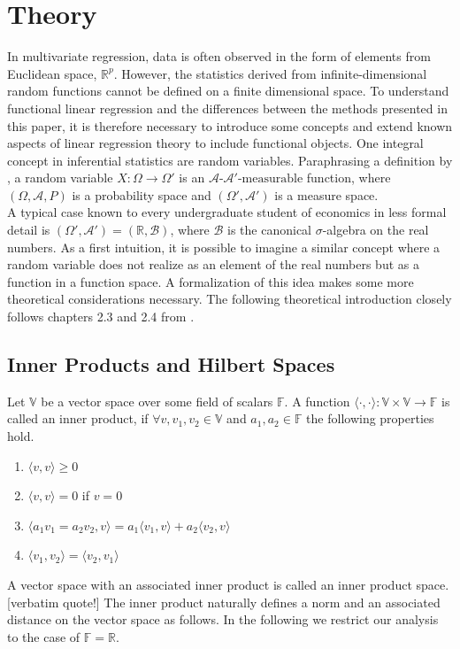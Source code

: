 \documentclass[11pt,twoside,a4paper]{article}
\begin{document}
	\section{Theory}
	In multivariate regression, data is often observed in the form of elements from Euclidean space, $\mathbb{R}^p$. However, the statistics derived from infinite-dimensional random functions cannot be defined on a finite dimensional space. To understand functional linear regression and the differences between the methods presented in this paper, it is therefore necessary to introduce some concepts and extend known aspects of linear regression theory to include functional objects. One integral concept in inferential statistics are random variables. Paraphrasing a definition by \cite{bauer_wahrscheinlichkeitstheorie_2020}, a random variable $X:\Omega \rightarrow \Omega'$ is an $\mathcal{A} \text{-} \mathcal{A'} \text{-measurable}$ function, where $(\Omega, \mathcal{A}, P)$ is a probability space and $(\Omega', \mathcal{A'})$ is a measure space.\\
	A typical case known to every undergraduate student of economics in less formal detail is $(\Omega', \mathcal{A'}) = (\mathbb{R}, \mathcal{B})$, where $\mathcal{B}$ is the canonical $\sigma$-algebra on the real numbers. As a first intuition, it is possible to imagine a similar concept where a random variable does not realize as an element of the real numbers but as a function in a function space. A formalization of this idea makes some more theoretical considerations necessary. The following theoretical introduction closely follows chapters 2.3 and 2.4 from \cite{hsing_theoretical_2015}. 
	
	\subsection{Inner Products and Hilbert Spaces}
	Let $\mathbb{V}$ be a vector space over some field of scalars $\mathbb{F}$. A function $\langle \cdot, \cdot \rangle : \mathbb{V} \times  \mathbb{V} \rightarrow \mathbb{F}$ is called an inner product, if $\forall v, v_1, v_2 \in \mathbb{V}$ and $a_1, a_2 \in \mathbb{F}$ the following properties hold.
	\begin{multicols}{2}
			\begin{enumerate}
			\item $\langle v, v \rangle \geq 0$
			\item $\langle v, v \rangle = 0$ if $v = 0$
			\item $\langle a_1 v_1 = a_2 v_2, v \rangle = a_1 \langle v_1, v \rangle + a_2 \langle v_2, v \rangle$
			\item $\langle v_1, v_2 \rangle = \langle v_2, v_1 \rangle$
		\end{enumerate}
	\end{multicols}
	A vector space with an associated inner product is called an inner product space. {\color{red}[verbatim quote!]}
	The inner product naturally defines a norm and an associated distance on the vector space as follows. In the following we restrict our analysis to the case of $\mathbb{F} = \mathbb{R}$.
	
\end{document}
